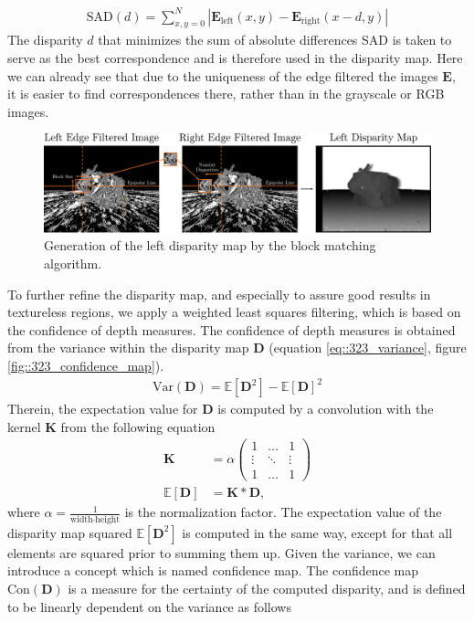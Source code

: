 \begin{align}
	\text{SAD}(d) = \sum_{x,y=0}^N |\bm{E}_\text{left}(x,y) - \bm{E}_\text{right}(x-d,y)|
	\label{eq::323_sad}
\end{align}
The disparity $d$ that minimizes the sum of absolute differences SAD is taken to serve as the best correspondence and is therefore used in the disparity map.  Here we can already see that due to the uniqueness of the edge filtered the images $\bm{E}$, it is easier to find correspondences there, rather than in the grayscale or RGB images.
\begin{figure}[h]
	\centering
	\includegraphics[scale=.28]{chapters/03_background/img/left_disparity_map.png}
	\caption{Generation of the left disparity map by the block matching algorithm.}
	\label{fig::323_left_disparity_map}
\end{figure}
To further refine the disparity map, and especially to assure good results in textureless  regions, we apply a weighted least squares filtering, which is based on the confidence of depth measures. The confidence of depth measures is obtained from the variance within the disparity map $\bm{D}$ (equation \ref{eq::323_variance}, figure \ref{fig::323_confidence_map}).
\begin{align}
	 \text{Var}(\bm{D}) = \mathbb{E}\left[\bm{D}^2\right] - \mathbb{E}\left[\bm{D}\right]^2
	\label{eq::323_variance}
\end{align} 
Therein, the expectation value for $\bm{D}$ is computed by a convolution with the kernel $\bm{K}$ from the following equation
\begin{align}
	\bm{K} &= \alpha
	\begin{pmatrix}
	1 & \dots & 1 \\
	\vdots & \ddots & \vdots \\
	1 & \dots & 1
	\end{pmatrix} \\
	\mathbb{E}\left[\bm{D}\right] &= \bm{K}*\bm{D},
	\label{eq::323_kernel}
\end{align}
where $\alpha = \frac{1}{\text{width}\cdot\text{height}}$ is the normalization factor. The expectation value of the disparity map squared $\mathbb{E}\left[\bm{D}^2\right]$ is computed in the same way, except for that all elements are squared prior to summing them up. Given the variance, we can introduce a concept which is named confidence map. The confidence map $\text{Con}(\bm{D})$ is a measure for the certainty of the computed disparity, and is defined to be linearly dependent on the variance as follows
